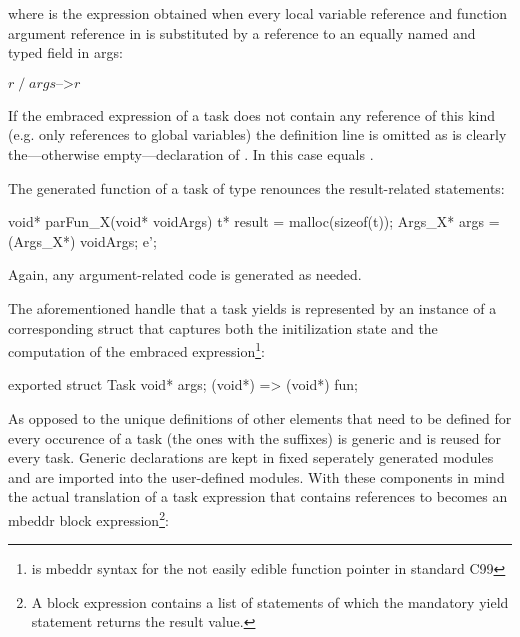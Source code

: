 where  is the expression obtained when every local variable reference and function argument reference  in  is substituted by a reference to an equally named and typed field in args:

$r\;/\;args\text{-->}r$

If the embraced expression of a task does not contain any reference of this kind (e.g. only references to global variables) the  definition line is omitted as is clearly the---otherwise empty---declaration of . In this case  equals .

The generated function of a task of type  renounces the result-related statements:

\begin{ccode}
void* parFun_X(void* voidArgs) {
  t* result = malloc(sizeof(t));
  Args_X* args = (Args_X*) voidArgs;
  e';
}
\end{ccode}

Again, any argument-related code is generated as needed.

The aforementioned handle that a task yields is represented by an instance of a corresponding struct that captures both the initilization state and the computation of the embraced expression\footnote{ is mbeddr syntax for the not easily edible function pointer  in standard C99}:
\begin{ccode}
exported struct Task {
  void* args;
  (void*) => (void*) fun;
}
\end{ccode}

As opposed to the unique definitions of other elements that need to be defined for every occurence of a task (the ones with the  suffixes)  is generic and is reused for every task. Generic declarations are kept in fixed seperately generated modules and are imported into the user-defined modules.
With these components in mind the actual translation of a task expression  that contains references  to  becomes an mbeddr block expression\footnote{A block expression contains a list of statements of which the mandatory yield statement returns the result value.}:

